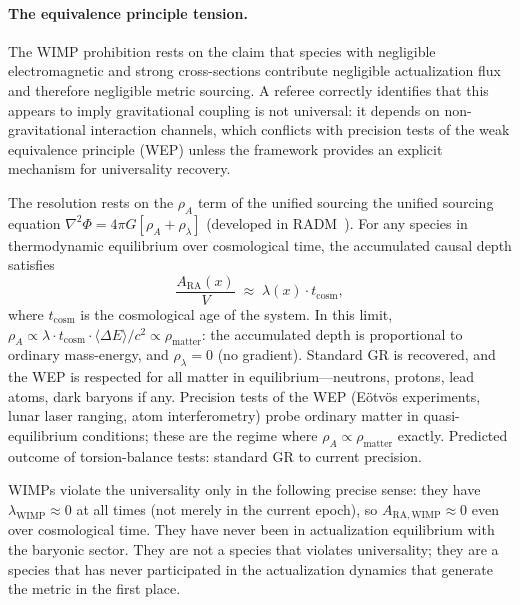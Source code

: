 \documentclass[11pt,a4paper]{article}
\theoremstyle{plain}
\theoremstyle{definition}
\theoremstyle{remark}
\begin{document}
\paragraph{The equivalence principle tension.}
The WIMP prohibition rests on the claim that species with negligible
electromagnetic and strong cross-sections contribute negligible actualization flux
and therefore negligible metric sourcing. A referee correctly identifies that this
appears to imply gravitational coupling is not universal: it depends on
non-gravitational interaction channels, which conflicts with precision tests of the
weak equivalence principle (WEP) unless the framework provides an explicit
mechanism for universality recovery.

The resolution rests on the $\rho_A$ term of the unified sourcing
the unified sourcing equation $\nabla^2\Phi = 4\pi G[\rho_A + \rho_\lambda]$ (developed in RADM~\citep{Sandeman2026RADM}). For any species in thermodynamic equilibrium
over cosmological time, the accumulated causal depth satisfies
\begin{equation}
  \frac{A_{\mathrm{RA}}(x)}{V} \;\approx\; \lambda(x) \cdot t_{\mathrm{cosm}},
  \label{eq:equilibrium_limit}
\end{equation}
where $t_{\mathrm{cosm}}$ is the cosmological age of the system. In this limit,
$\rho_A \propto \lambda \cdot t_{\mathrm{cosm}} \cdot \langle\Delta E\rangle/c^2
\propto \rho_{\mathrm{matter}}$: the accumulated depth is proportional to ordinary
mass-energy, and $\rho_\lambda = 0$ (no gradient). Standard GR is recovered, and
the WEP is respected for all matter in equilibrium---neutrons, protons, lead atoms,
dark baryons if any. Precision tests of the WEP (E\"otv\"os experiments, lunar
laser ranging, atom interferometry) probe ordinary matter in quasi-equilibrium
conditions; these are the regime where $\rho_A \propto \rho_{\mathrm{matter}}$
exactly. Predicted outcome of torsion-balance tests: standard GR to current
precision.

WIMPs violate the universality only in the following precise sense: they have
$\lambda_{\mathrm{WIMP}} \approx 0$ at all times (not merely in the current epoch),
so $A_{\mathrm{RA,WIMP}} \approx 0$ even over cosmological time. They have
never been in actualization equilibrium with the baryonic sector. They are not a
species that violates universality; they are a species that has never participated
in the actualization dynamics that generate the metric in the first place.
\end{document}
